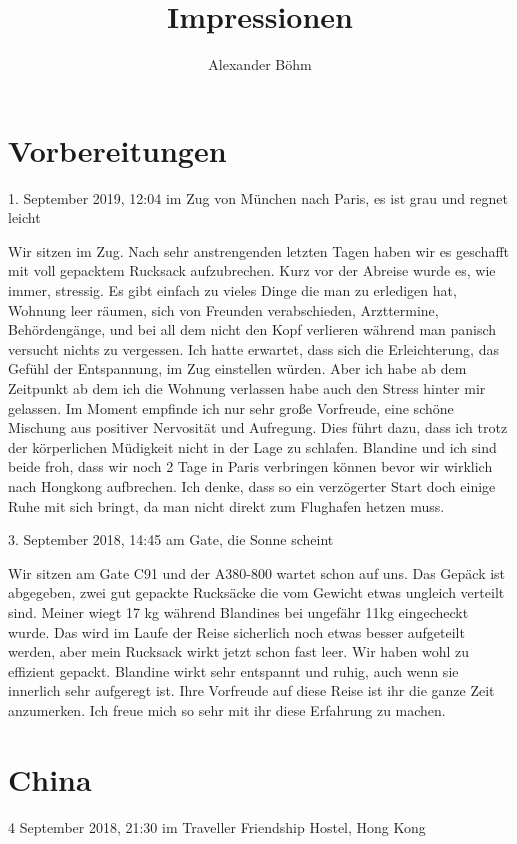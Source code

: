 \documentclass[11pt]{book}
\title{Impressionen}
\author{Alexander Böhm}
\begin{document}
\maketitle
\chapter{Vorbereitungen}
1. September 2019, 12:04 im Zug von München nach Paris, es ist grau und regnet leicht

Wir sitzen im Zug. Nach sehr anstrengenden letzten Tagen haben wir es geschafft mit voll gepacktem
Rucksack aufzubrechen. Kurz vor der Abreise wurde es, wie immer, stressig. Es gibt einfach zu vieles
Dinge die man zu erledigen hat, Wohnung leer räumen, sich von Freunden verabschieden, Arzttermine, 
Behördengänge, und bei all dem nicht den Kopf verlieren während man panisch versucht nichts zu 
vergessen. Ich hatte erwartet, dass sich die Erleichterung, das Gefühl der Entspannung, im Zug 
einstellen würden. Aber ich habe ab dem Zeitpunkt ab dem ich die Wohnung verlassen habe auch den 
Stress hinter mir gelassen. Im Moment empfinde ich nur sehr große Vorfreude, eine schöne Mischung
aus positiver Nervosität und Aufregung. Dies führt dazu, dass ich trotz der körperlichen Müdigkeit
nicht in der Lage zu schlafen. Blandine und ich sind beide froh, dass wir noch 2 Tage in
Paris verbringen können bevor wir wirklich nach Hongkong aufbrechen. Ich denke, dass so ein verzögerter Start doch 
einige Ruhe mit sich bringt, da man nicht direkt zum Flughafen hetzen muss. 

3. September 2018, 14:45 am Gate, die Sonne scheint

Wir sitzen am Gate C91 und der A380-800 wartet schon auf uns. Das Gepäck ist abgegeben, zwei gut 
gepackte Rucksäcke die vom Gewicht etwas ungleich verteilt sind. Meiner wiegt 17 kg während 
Blandines bei ungefähr 11kg eingecheckt wurde. Das wird im Laufe der Reise sicherlich noch etwas 
besser aufgeteilt werden, aber mein Rucksack wirkt jetzt schon fast leer. Wir haben wohl zu 
effizient gepackt. Blandine wirkt sehr entspannt und ruhig, auch wenn sie innerlich sehr aufgeregt 
ist. Ihre Vorfreude auf diese Reise ist ihr die ganze Zeit anzumerken. Ich freue mich so sehr mit 
ihr diese Erfahrung zu machen. 

\chapter{China}

4 September 2018, 21:30 im Traveller Friendship Hostel, Hong Kong
\end{document}
